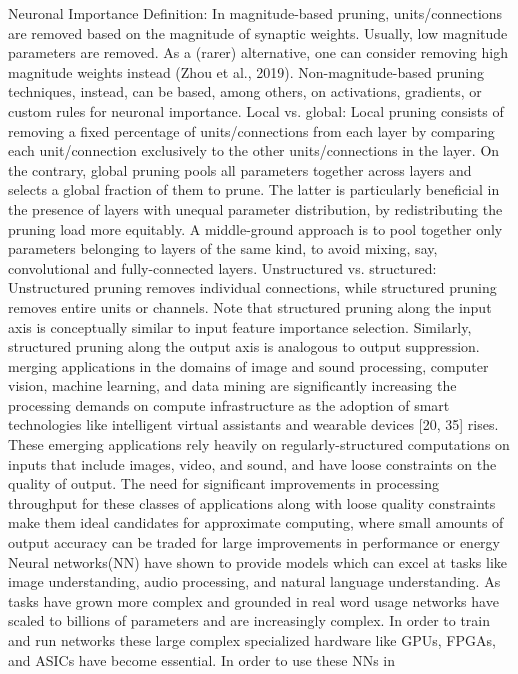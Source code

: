 \documentclass{article}
\begin{document}
Neuronal Importance Definition: In magnitude-based pruning, units/connections are removed
based on the magnitude of synaptic weights. Usually, low magnitude parameters are removed. As a
(rarer) alternative, one can consider removing high magnitude weights instead (Zhou et al., 2019).
Non-magnitude-based pruning techniques, instead, can be based, among others, on activations, gradients, or custom rules for neuronal importance.
Local vs. global: Local pruning consists of removing a fixed percentage of units/connections from
each layer by comparing each unit/connection exclusively to the other units/connections in the layer.
On the contrary, global pruning pools all parameters together across layers and selects a global fraction of them to prune. The latter is particularly beneficial in the presence of layers with unequal
parameter distribution, by redistributing the pruning load more equitably. A middle-ground approach is to pool together only parameters belonging to layers of the same kind, to avoid mixing,
say, convolutional and fully-connected layers.
Unstructured vs. structured: Unstructured pruning removes individual connections, while structured pruning removes entire units or channels. Note that structured pruning along the input axis is
conceptually similar to input feature importance selection. Similarly, structured pruning along the
output axis is analogous to output suppression.
merging applications in the domains of image and sound processing, computer vision, machine learning, and data mining are significantly increasing
the processing demands on compute infrastructure as the adoption of smart
technologies like intelligent virtual assistants  and wearable devices
[20, 35] rises. These emerging applications rely heavily on regularly-structured
computations on inputs that include images, video, and sound, and have loose
constraints on the quality of output. The need for significant improvements in
processing throughput for these classes of applications along with loose quality constraints make them ideal candidates for approximate computing, where
small amounts of output accuracy can be traded for large improvements in performance or energy
Neural networks(NN) have shown to provide models which can excel at tasks
like image understanding, audio processing, and natural language understanding. As tasks have grown more complex and grounded in real word usage networks have scaled to billions of parameters and are increasingly complex. In
order to train and run networks these large complex specialized hardware like
GPUs, FPGAs, and ASICs have become essential. In order to use these NNs in
\end{document}
